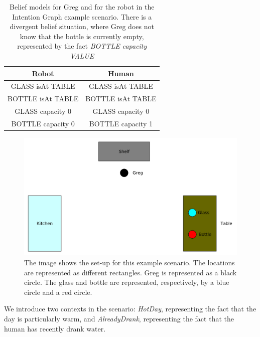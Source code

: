  \begin{table}[h!]
\centering
\scriptsize
\renewcommand{\arraystretch}{1.3}
\begin{tabular}{|c|c|}
\hline
Robot & Human \\ \hline \hline
GLASS isAt TABLE  & GLASS isAt TABLE \\ \hline
BOTTLE isAt TABLE & BOTTLE isAt TABLE \\ \hline
GLASS capacity 0  & GLASS capacity 0  \\ \hline
BOTTLE capacity 0 & BOTTLE capacity 1 \\ 
\hline
\end{tabular}
\caption[Belief models in the IG scenario]{Belief models for Greg and for the robot in the Intention Graph example scenario. There is a divergent belief situation, where Greg does not know that the bottle is currently empty, represented by the fact \textit{BOTTLE capacity VALUE} }
 \label{table:situation_assessment-ig_bm}    
\end{table}



 \begin{figure}[ht!]
	\includegraphics[scale=0.5]{img/situation_assessment/ig_scenario.pdf}
	\caption[IG Example Scenario]{The image shows the set-up for this example scenario. The locations are represented as different rectangles. Greg is represented as a black circle. The glass and bottle are represented, respectively, by a blue circle and a red circle.}
	\label{fig:situation_assessment-ig_scenario}
\end{figure}

We introduce two contexts in the scenario: \textit{HotDay}, representing the fact that the day is particularly warm, and \textit{AlreadyDrank}, representing the fact that the human has recently drank water.

